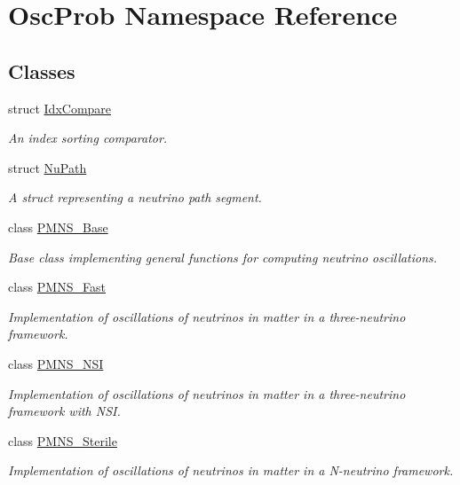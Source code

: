 \hypertarget{namespaceOscProb}{}\section{Osc\+Prob Namespace Reference}
\label{namespaceOscProb}
\subsection*{Classes}
\begin{DoxyCompactItemize}
\item 
struct \hyperlink{structOscProb_1_1IdxCompare}{Idx\+Compare}
\begin{DoxyCompactList}\small\item\em An index sorting comparator. \end{DoxyCompactList}\item 
struct \hyperlink{structOscProb_1_1NuPath}{Nu\+Path}
\begin{DoxyCompactList}\small\item\em A struct representing a neutrino path segment. \end{DoxyCompactList}\item 
class \hyperlink{classOscProb_1_1PMNS__Base}{P\+M\+N\+S\+\_\+\+Base}
\begin{DoxyCompactList}\small\item\em Base class implementing general functions for computing neutrino oscillations. \end{DoxyCompactList}\item 
class \hyperlink{classOscProb_1_1PMNS__Fast}{P\+M\+N\+S\+\_\+\+Fast}
\begin{DoxyCompactList}\small\item\em Implementation of oscillations of neutrinos in matter in a three-\/neutrino framework. \end{DoxyCompactList}\item 
class \hyperlink{classOscProb_1_1PMNS__NSI}{P\+M\+N\+S\+\_\+\+N\+SI}
\begin{DoxyCompactList}\small\item\em Implementation of oscillations of neutrinos in matter in a three-\/neutrino framework with N\+SI. \end{DoxyCompactList}\item 
class \hyperlink{classOscProb_1_1PMNS__Sterile}{P\+M\+N\+S\+\_\+\+Sterile}
\begin{DoxyCompactList}\small\item\em Implementation of oscillations of neutrinos in matter in a N-\/neutrino framework. \end{DoxyCompactList}\item 

\end{DoxyCompactItemize}
